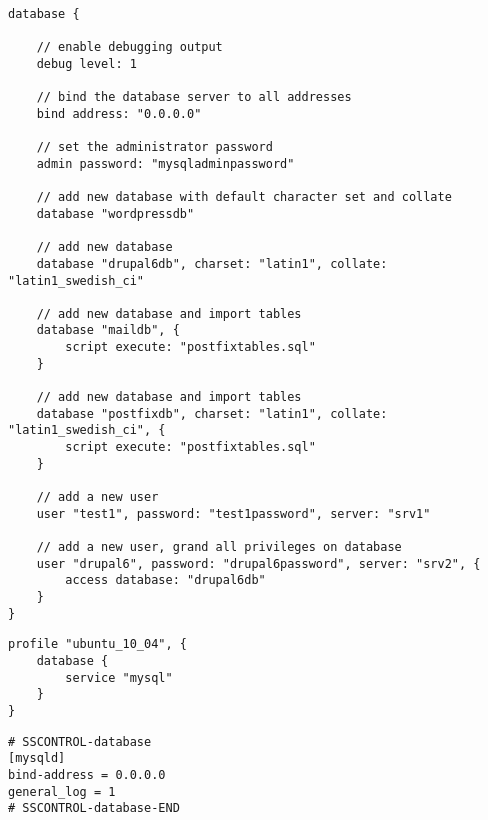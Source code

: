 
\begin{lstlisting}[style=Java,label=lst:database_example_script,
title={Example script for a database. It will set the database server address, create four databases and two users.}]
database {

    // enable debugging output
    debug level: 1

    // bind the database server to all addresses
    bind address: "0.0.0.0"

    // set the administrator password
    admin password: "mysqladminpassword"

    // add new database with default character set and collate
    database "wordpressdb"

    // add new database
    database "drupal6db", charset: "latin1", collate: "latin1_swedish_ci"

    // add new database and import tables
    database "maildb", {
        script execute: "postfixtables.sql"
    }

    // add new database and import tables
    database "postfixdb", charset: "latin1", collate: "latin1_swedish_ci", {
        script execute: "postfixtables.sql"
    }

    // add a new user
    user "test1", password: "test1password", server: "srv1"

    // add a new user, grand all privileges on database
    user "drupal6", password: "drupal6password", server: "srv2", {
        access database: "drupal6db"
    }
}
\end{lstlisting}

\begin{lstlisting}[style=Java,label=lst:database_ubuntu_profile_min,
title={Minimal Ubuntu database profile, only the database type is needed. The other profile properties are set to default values.}]
profile "ubuntu_10_04", {
    database {
        service "mysql"
    }
}
\end{lstlisting}

\begin{lstlisting}[style=rcfile_nonumbers,
label=lst:database_maincf_example,
title={Example MySQL server configuration file that is created from the database profile.
The file is saved as /etc/mysql/conf.d/sscontrol\_mysqld.cnf}]
# SSCONTROL-database
[mysqld]
bind-address = 0.0.0.0
general_log = 1
# SSCONTROL-database-END
\end{lstlisting}

